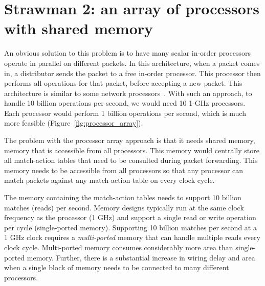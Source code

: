 \section{Strawman 2: an array of processors with shared memory}
An obvious solution to this problem is to have many scalar in-order processors
operate in parallel on different packets. In this architecture, when a packet
comes in, a distributor sends the packet to a free in-order processor. This
processor then performs all operations for that packet, before accepting a new
packet. This architecture is similar to some network processors~\cite{ixp1200,
ixp2800, quantumflow}.  With such an approach, to handle 10 billion operations
per second, we would need 10 1-GHz processors. Each processor would perform 1
billion operations per second, which is much more feasible
(Figure~\ref{fig:processor_array}).

The problem with the processor array approach is that it needs shared memory,
\ie memory that is accessible from all processors. This memory would centrally
store all match-action tables that need to be consulted during packet
forwarding. This memory needs to be accessible from all processors so that any
processor can match packets against any match-action table on every clock
cycle.

The memory containing the match-action tables needs to support 10 billion
matches (reads) per second. Memory designs typically run at the same clock
frequency as the processor (1 GHz) and support a single read or write operation
per cycle (single-ported memory). Supporting 10 billion matches per second at a
1 GHz clock requires a {\em multi-ported} memory that can handle multiple reads
every clock cycle. Multi-ported memory consumes considerably more area than
single-ported memory.  Further, there is a substantial increase in wiring delay
and area when a single block of memory needs to be connected to many different
processors.


